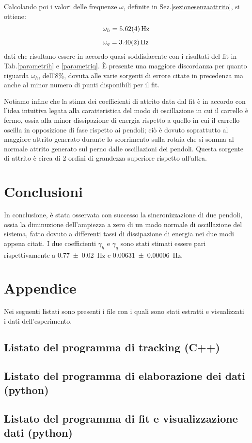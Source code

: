 \documentclass[11pt, a4paper, twoside]{article}
\begin{document}
Calcolando poi i valori delle frequenze $\omega$, definite in Sez.\ref{sezionesenzaattrito},
si ottiene:
$$
\omega_h = \SI{5.62 \pm 0.04}{\hertz}
$$
$$
\omega_q = \SI{3.40 \pm 0.02}{\hertz}
$$
dati che risultano essere in accordo quasi soddisfacente con i risultati del fit in Tab.\ref{parametrih}
e \ref{parametriq}. 
È presente una maggiore discordanza per quanto riguarda $\omega_h$, dell'8\%, dovuta 
alle varie sorgenti di errore citate in precedenza ma anche al minor numero di punti disponibili
per il fit.

Notiamo infine che la stima dei coefficienti di attrito data dal fit è in accordo 
con l'idea intuitiva legata alla caratteristica del modo di oscillazione in cui il carrello 
è fermo, ossia alla minor dissipazione di energia rispetto a quello in cui il carrello oscilla in opposizione di 
fase rispetto ai pendoli; ciò è dovuto soprattutto al maggiore attrito generato
durante lo scorrimento sulla rotaia che si somma al normale attrito generato sul perno 
dalle oscillazioni dei pendoli. Questa sorgente di attrito è circa di 2 ordini di grandezza superiore 
rispetto all'altra.
\section{Conclusioni}
In conclusione, è stata osservata con successo la sincronizzazione di due pendoli, ossia la 
 diminuzione dell'ampiezza a zero di un modo normale di oscillazione del sistema, fatto dovuto a differenti
tassi di dissipazione di energia nei due modi appena citati. I due coefficienti $\gamma_h$ 
e $\gamma_q$ sono stati stimati essere pari rispettivamente a \SI{0.77 \pm 0.02}{\hertz} e 
\SI{0.00631 \pm 0.00006}{\hertz}.

\section{Appendice}
Nei seguenti listati sono presenti i file con i quali sono stati estratti 
e visualizzati i dati dell'esperimento.
\subsection{Listato del programma di tracking (C++)}

\label{listatocpp}
\subsection{Listato del programma di elaborazione dei dati (python)}

\label{listatoavg}
\subsection{Listato del programma di fit e visualizzazione dati (python)}

\label{listatoplotter}
\end{document}
